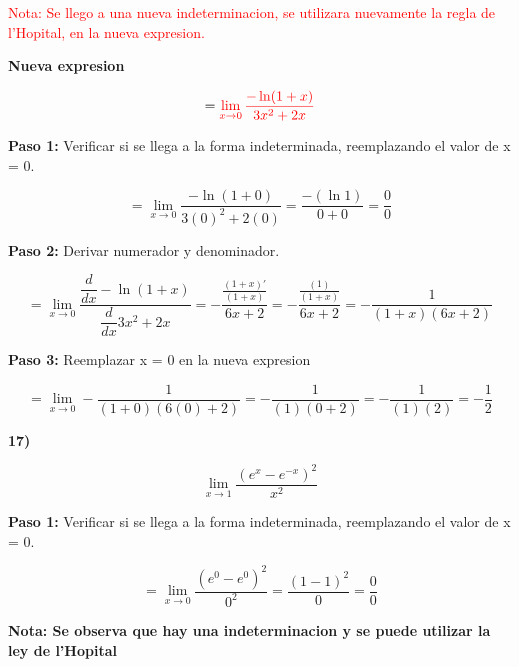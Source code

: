 \documentclass[12pt,a4paper]{article}
\begin{document}
\textcolor{red}{Nota: Se llego a una nueva indeterminacion, se utilizara nuevamente la regla de l'Hopital, en la nueva expresion.}

\vspace{0.2cm}

\textbf{Nueva expresion}

\[
= \textcolor{red}{\lim_{x \to 0} \frac{- \ln(1+x)}{3x^{2} + 2x}}
\]


\textbf{Paso 1:}
\vspace{0.2cm}
Verificar si se llega a la forma indeterminada, reemplazando el valor de x = 0.

\[
={\lim_{x \to 0} \frac{- \ln(1+0)}{3(0)^{2} + 2(0)}} = \frac{- (\ln 1)}{0+0}= \frac{0}{0} 
\]


\textbf{Paso 2:}
\vspace{0.2cm}
Derivar numerador y denominador.

\[
= \lim_{x \to 0} \frac{\dfrac{d}{dx} - \ln(1+x)}{\dfrac{d}{dx} 3x^{2} + 2x}=  -\frac{\frac{(1+x)'}{(1+x)}}{6x +2}= -\frac{\frac{(1)}{(1+x)}}{6x +2}= - \frac{1}{(1+x)(6x+2)}
\]


\textbf{Paso 3:}
\vspace{0.2cm}
Reemplazar x = 0 en la nueva expresion

\[
= \lim_{x \to 0} - \frac{1}{(1+0)(6(0)+2)}= - \frac{1}{(1)(0+2)}= -\frac{1}{(1)(2)}= - \frac{1}{2}
\]


\vspace{0.2cm}
\newpage



\textbf{17)}

\[
\lim_{x \to 1} \frac{(e^{x}- e^{-x})^2}{x^2} 
\]


\vspace{0.2cm}

\textbf{Paso 1:}
\vspace{0.2cm}
Verificar si se llega a la forma indeterminada, reemplazando el valor de x = 0.

\[
= \lim_{x \to 0} \frac{(e^{0}- e^{0})^2}{0^2}= \frac{(1-1)^2}{0}= \frac{0}{0}
\]

\vspace{0.2cm}

\textbf{Nota: Se observa que hay una indeterminacion y se puede utilizar la ley de l'Hopital }

\vspace{0.5cm}
\end{document}
